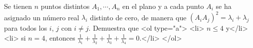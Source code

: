 Se tienen $n$ puntos distintos $A_1, \cdots , A_n$ en el plano y a cada punto $A_i$ se ha asignado un número real $\lambda_i$ distinto de cero, de manera que $(A_i A_j)^2 = \lambda_i + \lambda_j$ para todos los $i$, $j$ con $i \neq j$. Demuestra que
<ol type="a">
  <li> $n \leq 4$ y</li>
  <li> si $n = 4$, entonces $\frac{1}{\lambda_1} + \frac{1}{\lambda_2} + \frac{1}{\lambda_3} + \frac{1}{\lambda_4} = 0$.</li>
</ol>
